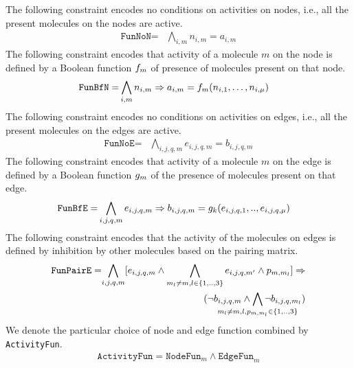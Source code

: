 The following constraint encodes no conditions on activities on nodes,
i.e., all the present molecules on the nodes are active.
\begin{align*}
\texttt{FunNoN} =& \bigwedge\limits_{i,m} n_{i,m} = a_{i,m}  
\end{align*}
The following constraint encodes that activity of a molecule $m$ on the node is
defined by a Boolean function $f_m$ of presence of molecules present on that node.
\begin{align*}
\texttt{FunBfN} =& \bigwedge\limits_{i,m} n_{i,m} \Rightarrow a_{i,m} =  f_m (n_{i,1},\dots,n_{i,\mu}) 
\end{align*}
The following constraint encodes no conditions on activities on edges,
i.e., all the present molecules on the edges are active.
\begin{align*}
 \texttt{FunNoE} =& \bigwedge\limits_{i,j,q,m} e_{i,j,q,m} = b_{i,j,q,m}
\end{align*}
The following constraint encodes that activity of a molecule $m$ on the edge is defined by a Boolean function $g_m$ of the presence of molecules present on that edge.
\begin{align*}
 \texttt{FunBfE} =& \bigwedge\limits_{i,j,q,m} e_{i,j,q,m} \Rightarrow b_{i,j,q,m} = g_k(e_{i,j,q,1}, .., e_{i,j,q,\mu} )
\end{align*}
%
The following constraint encodes that the activity of the molecules on
edges is defined by inhibition by other molecules based on the pairing
matrix. 
\begin{align*}
\texttt{FunPairE} =&	\begin{aligned}[t]
\bigwedge\limits_{i,j,q, m}  [e_{i,j,q,m} \land \bigwedge_{m_l \neq m,l \in \{1,..,3\}} e_{i,j,q,m'} \land p_{m, m_l}] \limplies\\
	(\neg b_{i,j,q,m} \land \bigwedge_{\mathclap{m_l \neq m,l, p_{m, m_l} \in \{1,..,3\}}} \neg b_{i,j,q,m_l})\end{aligned}\\
\end{align*}
%
We denote the particular choice of node and edge function combined by \texttt{ActivityFun}.
\begin{align*}
\texttt{ActivityFun} = \texttt{NodeFun}_m \land \texttt{EdgeFun}_m
\end{align*}
